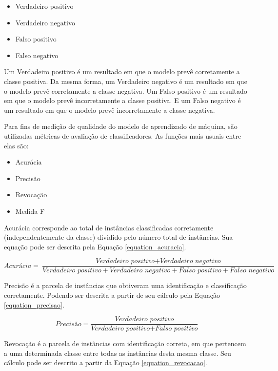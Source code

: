 \documentclass[
	12pt,				%
	oneside,			%
	a4paper,			%
	english,			%
	brazil				%
	]{abntex2ppgsi}
\begin{document}
\begin{itemize}
  \item Verdadeiro positivo
  \item Verdadeiro negativo
  \item Falso positivo
  \item Falso negativo
\end{itemize}

Um Verdadeiro positivo é um resultado em que o modelo prevê corretamente a classe positiva. Da mesma forma, um Verdadeiro negativo é um resultado em que o modelo prevê corretamente a classe negativa. Um Falso positivo é um resultado em que o modelo prevê incorretamente a classe positiva. E um Falso negativo é um resultado em que o modelo prevê incorretamente a classe negativa.

Para fins de medição de qualidade do modelo de aprendizado de máquina, são utilizadas métricas de avaliação de classificadores. As funções mais usuais entre elas são:

\begin{itemize}
  \item Acurácia
  \item Precisão
  \item Revocação
  \item Medida F
\end{itemize}

Acurácia corresponde ao total de instâncias classificadas corretamente (independentemente da classe) dividido pelo número total de instâncias. Sua equação pode ser descrita pela Equação \ref{equation_acuracia}.

\begin{equation}
  \textit{Acurácia}=\frac{\textit{Verdadeiro positivo} + \textit{Verdadeiro negativo}}{\textit{Verdadeiro positivo} + \textit{Verdadeiro negativo} + \textit{Falso positivo} + \textit{Falso negativo}}
  \label{equation_acuracia}
\end{equation}

Precisão é a parcela de instâncias que obtiveram uma identificação e classificação corretamente. Podendo ser descrita a partir de seu cálculo pela Equação \ref{equation_precisao}.

\begin{equation} 
  \textit{Precisão}=\frac{\textit{Verdadeiro positivo}}{\textit{Verdadeiro positivo} + \textit{Falso positivo}}
  \label{equation_precisao}
\end{equation}

Revocação é a parcela de instâncias com identificação correta, em que pertencem a uma determinada classe entre todas as instâncias desta mesma classe. Seu cálculo pode ser descrito a partir da Equação \ref{equation_revocacao}.
\end{document}
